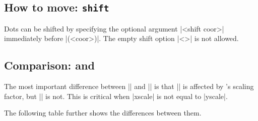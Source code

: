 \subsection{How to move: \texttt{shift}}
\label{ss:tzdot:shift}

Dots can be shifted by specifying the optional argument |<shift coor>| immediately before |(<coor>)|. The empty shift option |<>| is not allowed.

\begin{tzcode}{.3}
\end{tzcode}


\begin{tzcode}{.3}
\end{tzcode}


\subsection{Comparison: \protect\cmd{\tzdot} and \protect\cmd{\tzcdot}}
\label{ss:tzdot:comparison}

The most important difference between |\tzcdot| and |\tzdot| is that |\tzcdot| is affected by \Tikz's scaling factor, but |\tzdot| is not.
This is critical when |xscale| is not equal to |yscale|.

\begin{tzcode}{.3}
\end{tzcode}

The following table further shows the differences between them.


